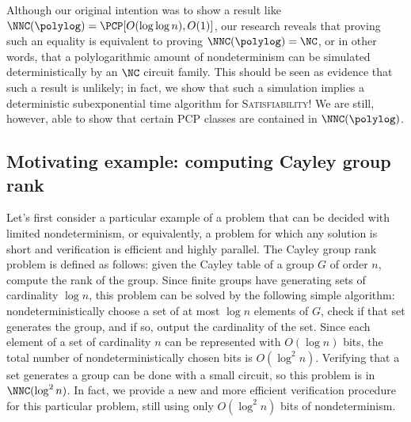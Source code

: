 \documentclass{article}
\begin{document}
Although our original intention was to show a result like $\NNC(\polylog) = \PCP[O(\log \log n), O(1)]$, our research reveals that proving such an equality is equivalent to proving $\NNC(\polylog) = \NC$, or in other words, that a polylogarithmic amount of nondeterminism can be simulated deterministically by an $\NC$ circuit family.
This should be seen as evidence that such a result is unlikely; in fact, we show that such a simulation implies a deterministic subexponential time algorithm for \textsc{Satisfiability}!
We are still, however, able to show that certain PCP classes are contained in $\NNC(\polylog)$.


\subsection{Motivating example: computing Cayley group rank}

Let's first consider a particular example of a problem that can be decided with limited nondeterminism, or equivalently, a problem for which any solution is short and verification is efficient and highly parallel.
The Cayley group rank problem is defined as follows: given the Cayley table of a group $G$ of order $n$, compute the rank of the group.
Since finite groups have generating sets of cardinality $\log n$, this problem can be solved by the following simple algorithm: nondeterministically choose a set of at most $\log n$ elements of $G$, check if that set generates the group, and if so, output the cardinality of the set.
Since each element of a set of cardinality $n$ can be represented with $O(\log n)$ bits, the total number of nondeterministically chosen bits is $O(\log^2 n)$.
Verifying that a set generates a group can be done with a small circuit, so this problem is in $\NNC(\log^2 n)$.
In fact, we provide a new and more efficient verification procedure for this particular problem, still using only $O(\log^2 n)$ bits of nondeterminism.
\end{document}
